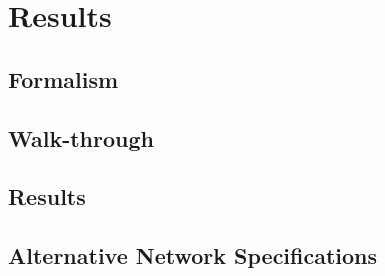 \chapter{Results}
\section{Formalism}
\section{Walk-through}
\section{Results}
\section{Alternative Network Specifications}
